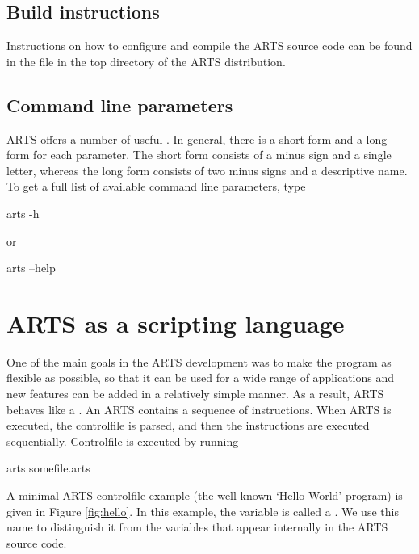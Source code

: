 \subsection{Build instructions}

Instructions on how to configure and compile the ARTS source code can
be found in the file  in the top directory of the
ARTS distribution.

\subsection{Command line parameters}

ARTS offers a number of useful . In
general, there is a short form and a long form for each parameter. The
short form consists of a minus sign and a single letter, whereas the
long form consists of two minus signs and a descriptive name. To get a
full list of available command line parameters, type
\begin{code}
  arts -h
\end{code}
or
\begin{code}
  arts --help
\end{code}

\section{ARTS as a scripting language}

One of the main goals in the ARTS development was to make the program
as flexible as possible, so that it can be used for a wide range of
applications and new features can be added in a relatively simple
manner. As a result, ARTS behaves like a . An ARTS  contains a sequence of
instructions. When ARTS is executed, the controlfile is parsed, and
then the instructions are executed sequentially. Controlfile
 is executed by running
\begin{code}
  arts somefile.arts
\end{code}
A minimal ARTS controlfile example (the well-known `Hello World' program) is
given in Figure \ref{fig:hello}. In this example, the variable  is
called a \emph{}. We use this name to distinguish
it from the variables that appear internally in the ARTS source code.

